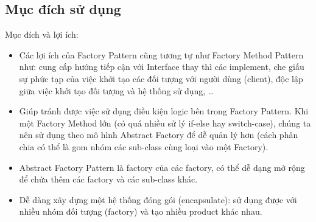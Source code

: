 \subsection{Mục đích sử dụng}
Mục đích và lợi ích:
\begin{itemize}
	\item	Các lợi ích của Factory Pattern cũng tương tự như Factory Method Pattern như: cung cấp hướng tiếp cận với Interface thay thì các implement, che giấu sự phức tạp của việc khởi tạo các đối tượng với người dùng (client), độc lập giữa việc khởi tạo đối tượng và hệ thống sử dụng, …
	\item   Giúp tránh được việc sử dụng điều kiện logic bên trong Factory Pattern. Khi một Factory Method lớn (có quá nhiều sử lý if-else hay switch-case), chúng ta nên sử dụng theo mô hình Abstract Factory để dễ quản lý hơn (cách phân chia có thể là gom nhóm các sub-class cùng loại vào một Factory).
	\item   Abstract Factory Pattern là factory của các factory, có thể dễ dạng mở rộng để chứa thêm các factory và các sub-class khác.
	\item 	Dễ dàng xây dựng một hệ thống đóng gói (encapsulate): sử dụng được với nhiều nhóm đối tượng (factory) và tạo nhiều product khác nhau.
\end{itemize}

